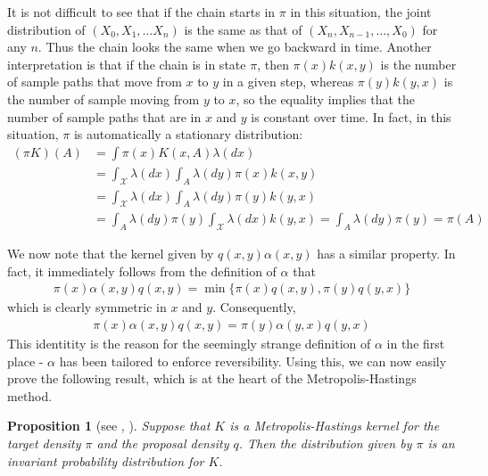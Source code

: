 \documentclass[a4paper, draft]{article}
\theoremstyle{own}
\newtheorem{prop}[thm]{Proposition}
\theoremstyle{remark}
\begin{document}
It is not difficult to see that if the chain starts in $\pi$ in this situation, the joint distribution of $(X_0, X_1, \dots X_n)$ is the same as that of $(X_n, X_{n-1}, \dots,X_0)$ for any $n$. Thus the chain looks the same when we go backward in time. Another interpretation is that if the chain is in state $\pi$, then $\pi(x) k(x,y)$ is the number of sample paths that move from $x$ to $y$ in a given step, whereas $\pi(y) k(y,x)$ is the number of sample moving from $y$ to $x$, so the equality implies that the number of sample paths that are in $x$ and $y$ is constant over time. In fact, in this situation, $\pi$ is automatically a stationary distribution:
\begin{align*}
(\pi K)(A) &= \int \pi(x) K(x,A) \lambda(dx)  \\
&= \int_{\mathcal X} \lambda(dx) \int_A \lambda(dy) \pi(x) k(x,y)   \\
&= \int_{\mathcal X} \lambda(dx) \int_A \lambda(dy) \pi(y) k(y,x)    \\
&= \int_A \lambda(dy) \pi(y)  \int_{\mathcal X} \lambda(dx)  k(y,x)  = \int_A \lambda(dy) \pi(y) 
= \pi(A)
\end{align*}


We now note that the kernel given by $q(x,y) \alpha(x,y)$ has a similar property. In fact, it immediately follows from the definition of $\alpha$ that
\begin{align}
\pi(x) \alpha(x,y) q(x,y) = \min \{ \pi(x) q(x,y), \pi(y) q(y,x)  \}
\end{align}
which is clearly symmetric in $x$ and $y$. Consequently, 
\begin{align}\label{eq:alphasymmetry}
\pi(x) \alpha(x,y) q(x,y) = \pi(y) \alpha(y,x) q(y,x)
\end{align}
This identitity is the reason for the seemingly strange definition of $\alpha$ in the first place - $\alpha$ has been tailored to enforce reversibility. Using this, we can now easily prove the following result, which is at the heart of the Metropolis-Hastings method.

\begin{prop}[see \cite{Hastings1970}, \cite{Peskun1973}]
	Suppose that $K$ is a Metropolis-Hastings kernel for the target density $\pi$ and the proposal density $q$. Then the distribution given by $\pi$ is an invariant probability distribution for $K$. 
\end{prop}
\end{document}
